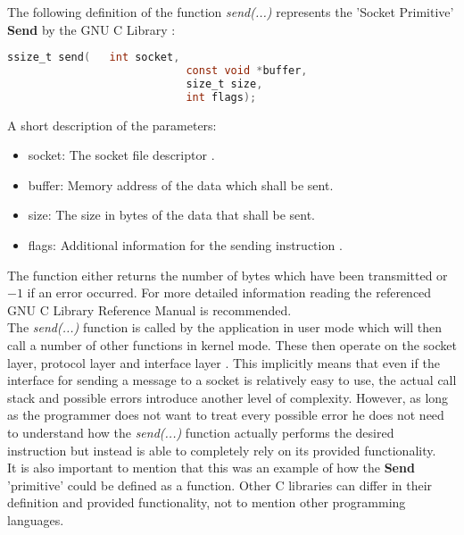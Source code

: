 \documentclass[xcolor=dvipsnames]{article}
\begin{document}
\noindent The following definition of the function \textit{send(...)} represents the 'Socket Primitive' \textbf{Send} by the GNU C Library \cite[p. 457, ch. 16.9.5.1]{GNU_C_library_manual}:

\begin{lstlisting}[language=C, numbers=none]
ssize_t send(	int socket, 
							const void *buffer, 
							size_t size, 
							int flags);
\end{lstlisting}

\noindent A short description of the parameters:

\begin{itemize}
\item socket: The socket file descriptor \cite[p. 427, ch. 16.2]{GNU_C_library_manual}.
\item buffer: Memory address of the data which shall be sent.
\item size: The size in bytes of the data that shall be sent.
\item flags: Additional information for the sending instruction \cite[p. 459, ch. 16.9.5.3]{GNU_C_library_manual}.
\end{itemize}

\noindent The function either returns the number of bytes which have been transmitted or $-1$ if an error occurred. For more detailed information reading the referenced GNU C Library Reference Manual \cite[p. 487, ch. 16.9.5.1]{GNU_C_library_manual} is recommended.\\

\noindent The \textit{send(...)} function is called by the application in user mode which will then call a number of other functions in kernel mode. These then operate on the socket layer, protocol layer and interface layer \cite[p. 2, 16]{IBM_Anupama}. This implicitly means that even if the interface for sending a message to a socket is relatively easy to use, the actual call stack and possible errors introduce another level of complexity. However, as long as the programmer does not want to treat every possible error he does not need to understand how the \textit{send(...)} function actually performs the desired instruction but instead is able to completely rely on its provided functionality.\\

\noindent It is also important to mention that this was an example of how the \textbf{Send} 'primitive' could be defined as a function. Other C libraries can differ in their definition and provided functionality, not to mention other programming languages.
\end{document}
